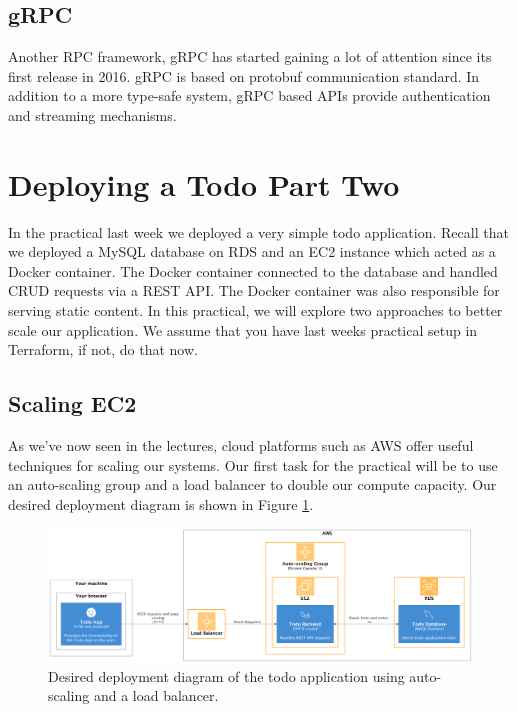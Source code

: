 \documentclass{csse4400}
\begin{document}
\subsection{gRPC}
Another RPC framework, gRPC has started gaining a lot of attention since its first release in 2016.
gRPC is based on protobuf communication standard.
In addition to a more type-safe system,
gRPC based APIs provide authentication and streaming mechanisms.

\section{Deploying a Todo Part Two}

In the practical last week we deployed a very simple todo application.
Recall that we deployed a MySQL database on RDS and an EC2 instance which acted as a Docker container.
The Docker container connected to the database and handled CRUD requests via a REST API.
The Docker container was also responsible for serving static content.
In this practical, we will explore two approaches to better scale our application.
We assume that you have last weeks practical setup in Terraform, if not, do that now.


\subsection{Scaling EC2}
As we've now seen in the lectures,
cloud platforms such as AWS offer useful techniques for scaling our systems.
Our first task for the practical will be to use an auto-scaling group and a load balancer to double our compute capacity.
Our desired deployment diagram is shown in Figure \ref{fig:scale}.

\begin{figure}[ht]
\includegraphics[width=\textwidth]{diagrams/ScaleDeployment}
\caption{Desired deployment diagram of the todo application using auto-scaling and a load balancer.}
\label{fig:scale}
\end{figure}
\end{document}
